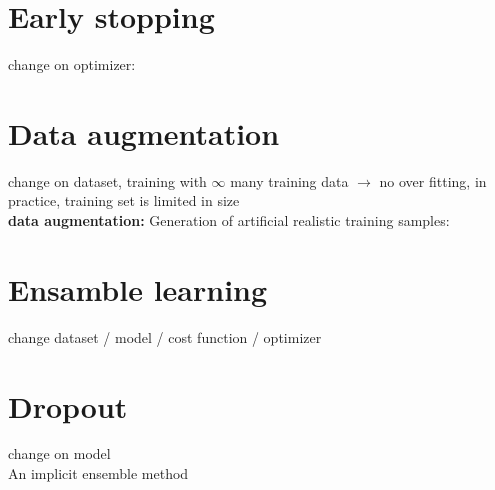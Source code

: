 \section{Early stopping}
change on optimizer:\\
\section{Data augmentation} 
change on dataset, training with $ \infty $ many training data $\rightarrow$ no over fitting, in practice, training set is limited in size\\
\textbf{data augmentation:} Generation of artificial realistic training samples: 
\section{Ensamble learning}
change dataset / model / cost function /  optimizer\\
\section{Dropout}
change on model \\
An implicit ensemble method\\
